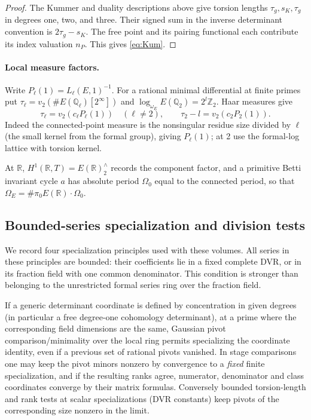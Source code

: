\begin{proof}
The Kummer and duality descriptions above give torsion lengths \(\tau_g,s_K,\tau_g\) in degrees one, two, and three. Their signed sum in the inverse determinant convention is \(2\tau_g-s_K\). The free point and its pairing functional each contribute its index valuation \(n_P\). This gives \eqref{eq:Kum}.
\end{proof}

\paragraph{Local measure factors.}
Write \(P_\ell(1)=L_\ell(E,1)^{-1}\). For a rational minimal differential at finite primes put \(\tau_\ell=v_2(\#E(\mathbb Q_\ell)[2^\infty])\) and \(\log_{\omega_E}E(\mathbb Q_2)=2^l\mathbb Z_2\). Haar measures give
\[
 \tau_\ell=v_2(c_\ell P_\ell(1))\quad(\ell\ne2),\qquad
 \tau_2-l=v_2(c_2 P_2(1)).
\]
Indeed the connected-point measure is the nonsingular residue size divided by \(\ell\) (the small kernel from the formal group), giving \(P_\ell(1)\); at 2 use the formal-log lattice with torsion kernel. 

At \(\mathbb R\), \(H^1(\mathbb R,T)=E(\mathbb R)^\wedge_2\) records the component factor, and a primitive Betti invariant cycle \(a\) has absolute period \(\Omega_0\) equal to the connected period, so that \(\Omega_E=\#\pi_0 E(\mathbb R)\cdot\Omega_0\).

\subsection{Bounded-series specialization and division tests}

We record four specialization principles used with these volumes. All series in these principles are bounded: their coefficients lie in a fixed complete DVR, or in its fraction field with one common denominator. This condition is stronger than belonging to the unrestricted formal series ring over the fraction field.

\begin{remark}\label{rem:foundations-pivots}
If a generic determinant coordinate is defined by concentration in given degrees (in particular a free degree-one cohomology determinant), at a prime where the corresponding field dimensions are the same, Gaussian pivot comparison/minimality over the local ring permits specializing the coordinate identity, even if a previous set of rational pivots vanished. In stage comparisons one may keep the pivot minors nonzero by convergence to a \emph{fixed} finite specialization, and if the resulting ranks agree, numerator, denominator and class coordinates converge by their matrix formulas. Conversely bounded torsion-length and rank tests at scalar specializations (DVR constants) keep pivots of the corresponding size nonzero in the limit.
\end{remark}

